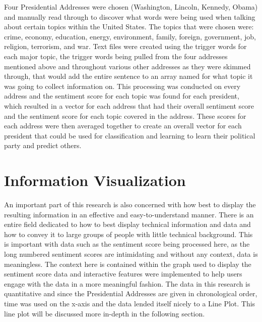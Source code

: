 Four Presidential Addresses were chosen (Washington, Lincoln, Kennedy, Obama) and manually read through to discover what words were being used when talking about certain topics within the United States. The topics that were chosen were: crime, economy, education, energy, environment, family, foreign, government, job, religion, terrorism, and war. Text files were created using the trigger words for each major topic, the trigger words being pulled from the four addresses mentioned above and throughout various other addresses as they were skimmed through, that would add the entire sentence to an array named for what topic it was going to collect information on. This processing was conducted on every address and the sentiment score for each topic was found for each president, which resulted in a vector for each address that had their overall sentiment score and the sentiment score for each topic covered in the address. These scores for each address were then averaged together to create an overall vector for each president that could be used for classification and learning to learn their political party and predict others.

\section{Information Visualization}
An important part of this research is also concerned with how best to display the resulting information in an effective and easy-to-understand manner.
There is an entire field dedicated to how to best display technical information and data and how to convey it to large groups of people with little technical background.
This is important with data such as the sentiment score being processed here, as the long numbered sentiment scores are intimidating and without any context, data is meaningless.
The context here is contained within the graph used to display the sentiment score data and interactive features were implemented to help users engage with the data in a more meaningful fashion.
The data in this research is quantitative and since the Presidential Addresses are given in chronological order, time was used on the x-axis and the data lended itself nicely to a Line Plot.
This line plot will be discussed more in-depth in the following section.

